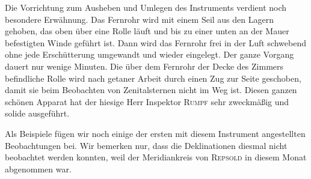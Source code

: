 \par\indent Die Vorrichtung zum Ausheben und Umlegen des Instruments verdient noch besondere Erwähnung. Das Fernrohr wird mit einem Seil aus den Lagern gehoben, das oben über eine Rolle läuft und bis zu einer unten an der Mauer befestigten Winde geführt ist. Dann wird das Fernrohr frei in der Luft schwebend ohne jede Erschütterung umgewandt und wieder eingelegt. Der ganze Vorgang dauert nur wenige Minuten. Die über dem Fernrohr der Decke des Zimmers befindliche Rolle wird nach getaner Arbeit durch einen Zug zur Seite geschoben, damit sie beim Beobachten von Zenitalsternen nicht im Weg ist. Diesen ganzen schönen Apparat hat der hiesige Herr Inspektor \textsc{Rumpf} sehr zweckmäßig und solide ausgeführt.

\par\indent Als Beispiele fügen wir noch einige der ersten mit diesem Instrument angestellten Beobachtungen bei. Wir bemerken nur, dass die Deklinationen diesmal nicht beobachtet werden konnten, weil der Meridiankreis von \textsc{Repsold} in diesem Monat abgenommen war.

